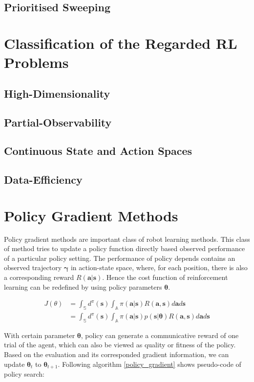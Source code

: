 \documentclass[officiallayout]{tktla}
\newcommand{\bsym}{\boldsymbol}
\begin{document}
\subsection{Prioritised Sweeping}


\section{Classification of the Regarded RL Problems}
\subsection{High-Dimensionality}
\subsection{Partial-Observability}
\subsection{Continuous State and Action Spaces}
\subsection{Data-Efficiency}
\section{Policy Gradient Methods}
Policy gradient methods are important class of robot learning methods. This class of method tries to update a policy function directly based observed performance of a particular policy setting. The performance of policy depends contains an observed trajectory $\boldsymbol{\gamma}$ in action-state space, where, for each position, there is also a corresponding reward $R(\boldsymbol{a}|\boldsymbol{s})$. Hence the cost function of reinforcement learning can be redefined by using policy parameters $\boldsymbol{\theta}$.

\begin{align}
J(\theta) &=\int_\mathbb{S}d^\pi(\boldsymbol{s})\int_\mathbb{A}\pi(\boldsymbol{a}|\boldsymbol{s})R(\boldsymbol{a}, \boldsymbol{s})d\boldsymbol{a}d\boldsymbol{s} \\
&=\int_\mathbb{S}d^\pi(\boldsymbol{s})\int_\mathbb{A}\pi(\boldsymbol{a}|\boldsymbol{s})p(\boldsymbol{s}|\boldsymbol{\theta})R(\boldsymbol{a}, \boldsymbol{s})d\boldsymbol{a}d\boldsymbol{s}
\end{align}

With certain parameter $\bsym\theta$, policy can generate a communicative reward of one trial of the agent, which can also be viewed as quality or fitness of the policy. Based on the evaluation and its corresponded gradient information, we can update $\bsym{\theta}_t$ to $\bsym{\theta}_{t+1}$. Following algorithm \ref{policy_gradient} shows pseudo-code of policy search:
\end{document}
